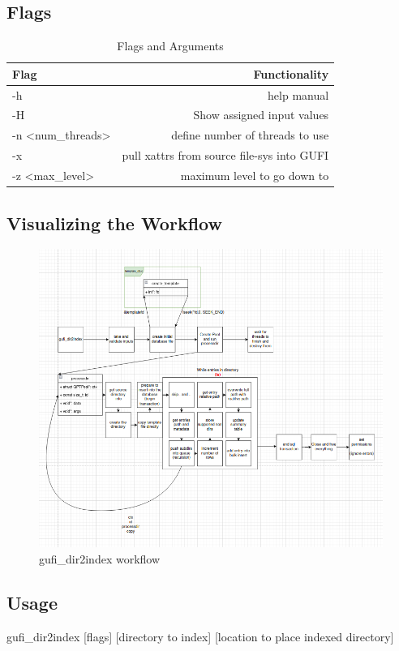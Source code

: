 \documentclass{article}
\begin{document}
\subsection{Flags}

\begin{table} [h]
\centering
\begin{tabular}{l|r}
Flag & Functionality \\\hline
-h & help manual \\
-H & Show assigned input values \\
-n \textless num\_threads\textgreater  & define number of threads to use \\
-x & pull xattrs from source file-sys into GUFI \\
-z \textless max\_level\textgreater & maximum level to go down to
\end{tabular}
\caption{\label{tab:widgets}Flags and Arguments}
\end{table}
\clearpage
\subsection{Visualizing the Workflow}
\begin{figure} [h]
\centering
\includegraphics[width=1.0\textwidth]{gufi_dir2index.png}
\caption{\label{fig:gufi dir2index} gufi\_dir2index workflow}
\end{figure}

\subsection{Usage}
gufi\_dir2index [flags] [directory to index] [location to place indexed directory]
\end{document}
